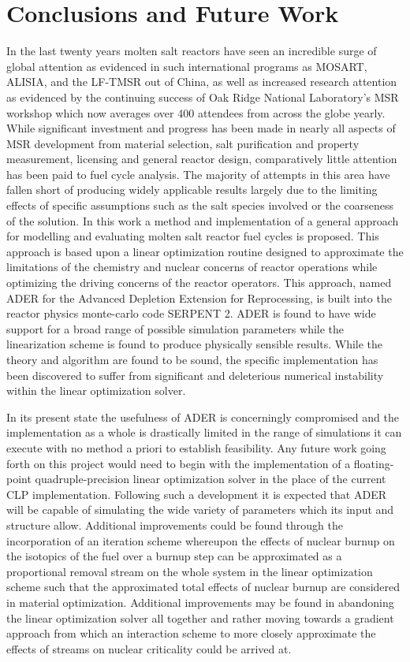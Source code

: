 \chapter{Conclusions and Future Work}
\label{ch:conc}

In the last twenty years molten salt reactors have seen an incredible surge of
global attention as evidenced in such international programs as MOSART, ALISIA,
and the LF-TMSR out of China, as well as increased research attention as
evidenced by the continuing success of Oak Ridge National Laboratory's MSR
workshop which now averages over 400 attendees from across the globe yearly. 
While significant investment and progress has been made in nearly all aspects
of MSR development from material selection, salt purification and property
measurement, licensing and general reactor design, comparatively little
attention has been paid to fuel cycle analysis. The majority of attempts in
this area have fallen short of producing widely applicable results largely due
to the limiting effects of specific assumptions such as the salt species
involved or the coarseness of the solution. In this work a method and
implementation of a general approach for modelling and evaluating molten salt
reactor fuel cycles is proposed. This approach is based upon a linear
optimization routine designed to approximate the limitations of the chemistry
and nuclear concerns of reactor operations while optimizing the driving concerns
of the reactor operators. This approach, named ADER for the Advanced Depletion
Extension for Reprocessing, is built into the reactor physics monte-carlo code
SERPENT 2. ADER is found to have wide support for a broad range of possible
simulation parameters while the linearization scheme is found to produce
physically sensible results. While the theory and algorithm are found to be
sound, the specific implementation has been discovered to suffer from
significant and deleterious numerical instability within the 
linear optimization solver.

In its present state the usefulness of ADER is concerningly compromised and
the implementation as a whole is drastically limited in the range of simulations
it can execute with no method a priori to establish feasibility. Any future
work going forth on this project would need to begin with the implementation
of a floating-point quadruple-precision linear optimization solver in the place
of the current CLP implementation. Following such a development it is expected
that ADER will be capable of simulating the wide variety of parameters which its
input and structure allow. Additional improvements could be found through the
incorporation of an iteration scheme whereupon the effects of nuclear burnup
on the isotopics of the fuel over a burnup step can be approximated as a
proportional removal stream on the whole system in the linear optimization
scheme such that the approximated total effects of nuclear burnup are considered
in material optimization. Additional improvements may be found in abandoning the
linear optimization solver all together and rather moving towards a gradient
approach from which an interaction scheme to more closely approximate the 
effects of streams on nuclear criticality could be arrived at. 

